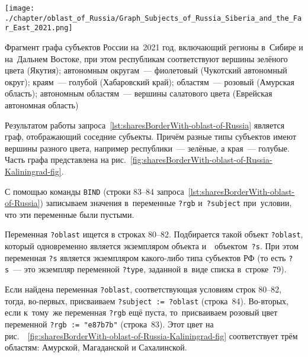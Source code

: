 \newpage
\begin{marginfigure}[0\baselineskip]
	\texttt{[image: ./chapter/oblast\_of\_Russia/Graph\_Subjects\_of\_Russia\_Siberia\_and\_the\_Far\_East\_2021.png]}
	\caption[Фрагмент графа субъектов России, 2021 год.]
    {Фрагмент графа субъектов России на~2021 год, 
    включающий регионы в~Сибире и на~Дальнем Востоке, 
    при этом 
	республикам соответствуют вершины зелёного цвета (Якутия); 
	автономным округам~--- фиолетовый (Чукотский автономный округ);
	краям~--- голубой (Хабаровский край);
	областям~--- розовый (Амурская область);
	автономным областям~--- вершины салатового цвета (Еврейская автономная область)}%
      \label{fig:sharesBorderWith-oblast-of-Russia-Kaliningrad-fig}%
\end{marginfigure}

Результатом работы запроса~\ref{lst:sharesBorderWith-oblast-of-Russia} является граф, 
отображающий соседние субъекты. 
Причём разные типы субъектов имеют вершины разного цвета, 
например республики~--- зелёные, а края~--- голубые. 
Часть графа представлена на рис.~\ref{fig:sharesBorderWith-oblast-of-Russia-Kaliningrad-fig}.%

С помощью команды \lstinline|BIND| (строки 83--84 запроса~\ref{lst:sharesBorderWith-oblast-of-Russia}) 
записываем значения в~переменные \lstinline|?rgb| и~\mbox{\lstinline|?subject|} 
при~условии, что эти переменные были пустыми. 

Переменная \lstinline|?oblast| ищется в строках 80--82. 
Подбирается такой объект \lstinline|?oblast|, 
который одновременно является 
экземпляром объекта  
и~~объектом~\lstinline|?s|. 
При этом переменная \lstinline|?s| является экземпляром какого-либо типа субъектов РФ 
(то есть \lstinline|?s|~--- это экземпляр переменной \lstinline|?type|, 
заданной в~виде списка в~строке~79).

Если найдена переменная \lstinline|?oblast|, 
соответствующая условиям строк 80--82, 
тогда, во-первых, присваиваем \lstinline|?subject := ?oblast| (строка~84). 
Во-вторых, если к~тому~же переменная \lstinline|?rgb| ещё пуста, 
то~присваиваем розовый цвет переменной \lstinline|?rgb := "e87b7b"| (строка~83). 
Этот цвет на рис.~\protect~\ref{fig:sharesBorderWith-oblast-of-Russia-Kaliningrad-fig} 
соответствует трём областям: Амурской, Магаданской и Сахалинской. 

